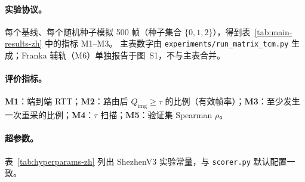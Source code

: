 \paragraph{实验协议。}
每个基线、每个随机种子模拟 500 帧（种子集合 $\{0,1,2\}$），得到表~\ref{tab:main-results-zh} 中的指标 M1--M3。
主表数字由 \texttt{experiments/run\_matrix\_tcm.py} 生成；Franka 辅轨（M6）单独报告于图~S1，不与主表合并。

\paragraph{评价指标。}
\textbf{M1}：端到端 RTT；\textbf{M2}：路由后 $Q_{\mathrm{img}}\geq\tau$ 的比例（有效帧率）；\textbf{M3}：至少发生一次重采的比例；\textbf{M4}：$\tau$ 扫描；\textbf{M5}：验证集 Spearman $\rho$。

\paragraph{超参数。}
表~\ref{tab:hyperparams-zh} 列出 ShezhenV3 实验常量，与 \texttt{scorer.py} 默认配置一致。

\begin{table}[t]
\centering
\caption{关键超参数（Paper~I，ShezhenV3 验证）。}
\label{tab:hyperparams-zh}
\small
{}
\end{table}

